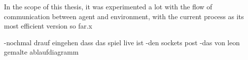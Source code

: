 In the scope of this thesis, it was experimented a lot with the flow of communication between agent and environment, with the current process as its most efficient version so far.x






-nochmal drauf eingehen dass das spiel live ist
-den sockets post
-das von leon gemalte ablaufdiagramm

\begin{figure}
	\centering
	\resizebox{1.1\textwidth}{!}{
		
	}
\end{figure}


